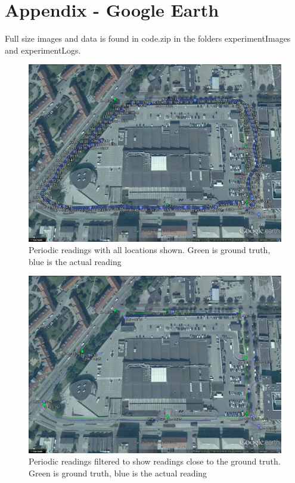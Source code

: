 \section{Appendix - Google Earth}
Full size images and data is found in code.zip in the folders experimentImages and experimentLogs.

\begin{figure}[ht]
\includegraphics[scale=0.2]{figures/periodicRSAll}
\caption{Periodic readings with all locations shown. Green is ground truth, blue is the actual reading}
\end{figure}

\begin{figure}[ht]
\includegraphics[scale=0.2]{figures/periodicRS}
\caption{Periodic readings filtered to show readings close to the ground truth. Green is ground truth, blue is the actual reading}
\end{figure}

